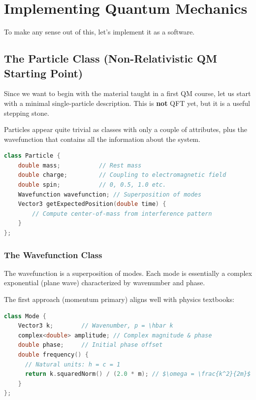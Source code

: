 \chapter{Implementing Quantum Mechanics}
\label{chap:implementing-qm}

To make any sense out of this, let's implement it as a software.

\section{The Particle Class (Non-Relativistic QM Starting Point)}

Since we want to begin with the material taught in a first QM course, let us start with a minimal single-particle description.
This is \textbf{not} QFT yet, but it is a useful stepping stone.

Particles appear quite trivial as classes with only a couple of attributes, plus the wavefunction that contains all the information about the system.

\begin{lstlisting}[language=C++, caption=Single-Particle Class (QM Level)]
class Particle {
    double mass;           // Rest mass
    double charge;         // Coupling to electromagnetic field
    double spin;           // 0, 0.5, 1.0 etc.
    Wavefunction wavefunction; // Superposition of modes
    Vector3 getExpectedPosition(double time) {
        // Compute center-of-mass from interference pattern
    }
};
\end{lstlisting}

\subsection*{The Wavefunction Class}

The wavefunction is a superposition of modes. Each mode is essentially a complex exponential (plane wave) characterized by wavenumber and phase.

The first approach (momentum primary) aligns well with physics textbooks:

\begin{lstlisting}[language=C++, caption=Mode with Momentum (Recommended for QM)]
class Mode {
    Vector3 k;        // Wavenumber, p = \hbar k
    complex<double> amplitude; // Complex magnitude & phase
    double phase;     // Initial phase offset
    double frequency() {
      // Natural units: h = c = 1
      return k.squaredNorm() / (2.0 * m); // $\omega = \frac{k^2}{2m}$
    }
};
\end{lstlisting}

